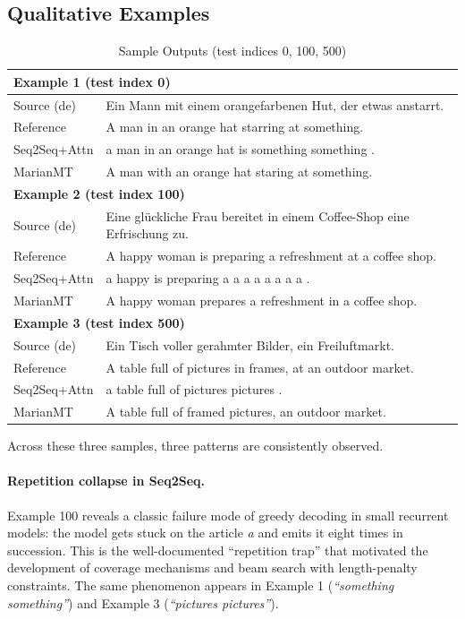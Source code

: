 \subsection{Qualitative Examples}

\begin{table}[h]
\centering
\caption{Sample Outputs (test indices 0, 100, 500)}
\label{tab:q4_qual}
\small
\begin{tabular}{p{}p{}}
\toprule
\multicolumn{2}{l}{\textbf{Example 1 (test index 0)}} \\
\midrule
Source (de)  & Ein Mann mit einem orangefarbenen Hut, der etwas anstarrt. \\
Reference    & A man in an orange hat starring at something. \\
Seq2Seq+Attn & a man in an orange hat is something something . \\
MarianMT     & A man with an orange hat staring at something. \\
\midrule
\multicolumn{2}{l}{\textbf{Example 2 (test index 100)}} \\
\midrule
Source (de)  & Eine glückliche Frau bereitet in einem Coffee-Shop eine Erfrischung zu. \\
Reference    & A happy woman is preparing a refreshment at a coffee shop. \\
Seq2Seq+Attn & a happy is preparing a a a a a a a a . \\
MarianMT     & A happy woman prepares a refreshment in a coffee shop. \\
\midrule
\multicolumn{2}{l}{\textbf{Example 3 (test index 500)}} \\
\midrule
Source (de)  & Ein Tisch voller gerahmter Bilder, ein Freiluftmarkt. \\
Reference    & A table full of pictures in frames, at an outdoor market. \\
Seq2Seq+Attn & a table full of pictures pictures . \\
MarianMT     & A table full of framed pictures, an outdoor market. \\
\bottomrule
\end{tabular}
\end{table}

Across these three samples, three patterns are consistently observed.

\paragraph{Repetition collapse in Seq2Seq.}
Example 100 reveals a classic failure mode of greedy decoding in small
recurrent models: the model gets stuck on the article \textit{a} and
emits it eight times in succession. This is the well-documented
``repetition trap'' that motivated the development of coverage
mechanisms and beam search with length-penalty constraints. The same
phenomenon appears in Example 1 (\textit{``something something''}) and
Example 3 (\textit{``pictures pictures''}).

